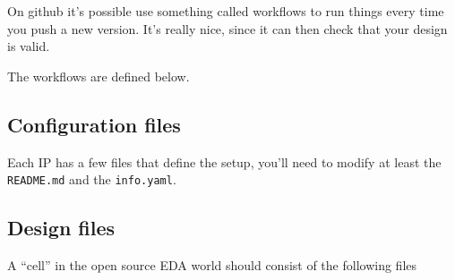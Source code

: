 On github it's possible use something called workflows to run things
every time you push a new version. It's really nice, since it can then
check that your design is valid.

The workflows are defined below.

\begin{Shaded}
\begin{Highlighting}[]
    
     
     
     
\end{Highlighting}
\end{Shaded}

\subsection{Configuration files}\label{configuration-files}

Each IP has a few files that define the setup, you'll need to modify at
least the \texttt{README.md} and the \texttt{info.yaml}.

\begin{Shaded}
\begin{Highlighting}[]
   
    
  
    
        
  \AttributeTok{{-}}\OperatorTok{\textgreater{}}
\end{Highlighting}
\end{Shaded}

\subsection{Design files}\label{design-files}

A ``cell'' in the open source EDA world should consist of the following
files

